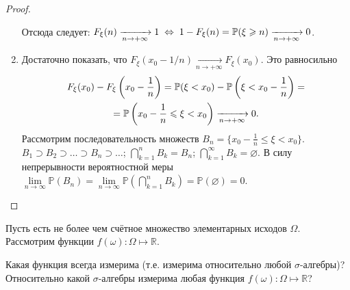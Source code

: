 \begin{proof}
\begin{enumerate}
        Отсюда следует: $F_\xi(n) \xrightarrow[n \to +\infty]{} 1 \; \Leftrightarrow \; 1 - F_\xi(n) = {\mathbb{P}(\xi \geqslant n)} \xrightarrow[n \to +\infty]{} 0$.
\iffalse    
        Аналогично, пусть $B_n = \{\xi \geqslant n\}, B_{n+1} = \{\xi \geqslant (n+1) \} \subseteq B_n, \ldots$:
        \begin{equation*}
            \bigcap\limits_{j = 1}^{\infty}B_j = \varnothing \Rightarrow \xi(w) > x \quad \forall x \in \mathbb{R}
        \end{equation*}
        Следовательно, 
        \begin{equation*}
            1 - F_\xi(n) = \myprob{B_n} \xrightarrow[n \to +\infty]{} \myprob{B} = 0 \Rightarrow F_\xi(n) \xrightarrow[n \to +\infty]{}1
        \end{equation*}
\fi
    \item
        Достаточно показать, что $F_\xi(x_0 - 1/n) \xrightarrow[n \to +\infty]{} F_\xi(x_0)$. 
        Это равносильно 
        \begin{multline*}
            F_\xi(x_0) - F_\xi \left(x_0 - \frac{1}{n} \right) 
            = {\mathbb{P}(\xi < x_0)} - \mathbb{P}\left( \xi < x_0 - \frac{1}{n} \right) = \\ 
            = \mathbb{P}\left( x_0 - \frac{1}{n} \leqslant \xi < x_0 \right) \xrightarrow[n \to +\infty]{} 0.
        \end{multline*}
        Рассмотрим последовательность множеств $B_n = \{ x_0 - \frac{1}{n} \leqslant \xi < x_0 \} $. 
        $B_1 \supset B_2 \supset \ldots \supset B_n \supset \ldots$; 
        $\bigcap\limits_{k=1}^{n}B_k = B_n$;
        $\bigcap\limits_{k=1}^{\infty}B_k = \varnothing$.
        В силу непрерывности вероятностной меры 
        $\lim\limits_{n \to \infty} \mathbb{P}(B_n) = 
        \lim\limits_{n \to \infty} \mathbb{P}\left( \bigcap\limits_{k=1}^{n}B_k \right) = 
        \mathbb{P}(\varnothing) = 0$.
\end{enumerate}
\end{proof}

\begin{task}
Пусть есть не более чем счётное множество элементарных исходов $\Omega$. 
Рассмотрим функции ${f(\omega) \colon \Omega \mapsto \mathbb{R}}$.

Какая функция всегда измерима (т.е. измерима относительно любой ${\sigma \text{-алгебры}}$)? 
Относительно какой ${\sigma \text{-алгебры}}$ измерима любая функция ${f(\omega) \colon \Omega \mapsto \mathbb{R}}$?
\end{task}
